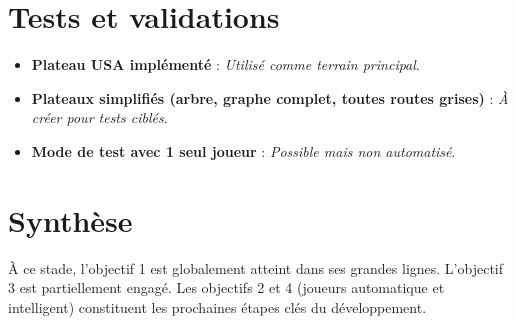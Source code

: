 \documentclass[a4paper,12pt]{report}
\begin{document}
\section*{Tests et validations}

\begin{itemize}
    \item \textbf{Plateau USA implémenté} : \textit{Utilisé comme terrain principal}.
    \item \textbf{Plateaux simplifiés (arbre, graphe complet, toutes routes grises)} : \textit{À créer pour tests ciblés}.
    \item \textbf{Mode de test avec 1 seul joueur} : \textit{Possible mais non automatisé}.
\end{itemize}

\section*{Synthèse}

À ce stade, l’objectif 1 est globalement atteint dans ses grandes lignes. L’objectif 3 est partiellement engagé. Les objectifs 2 et 4 (joueurs automatique et intelligent) constituent les prochaines étapes clés du développement.
\end{document}

